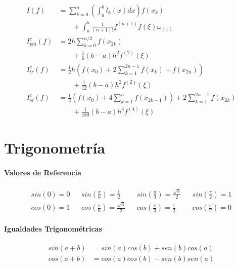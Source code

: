 \documentclass[a4paper]{article}
\begin{document}
\begin{multicols}{2}
        \begin{align*}
          I(f) &= \sum_{k=0}^n \left(\int_a^bl_k(x) dx \right) f(x_k) \\
                        & \quad \quad + \int_a^b \frac{1}{(n+1)!}f^{(n+1)}f(\xi)\omega_(x)\\
          I_{pm} ^ c(f) &= 2h\sum_{k=0}^{n/2}f\left(x_{2k}\right) \\
                        & \quad \quad + \frac{1}{6}(b-a)h^2f^{(2)}(\xi) \\
          I_{tr} ^ c(f) &= \frac{1}{2}h(f(x_0) + 2 \sum_{k=1}^{2n-1} f(x_k) + f(x_{2n})) \\
                        & \quad \quad +  \frac{1}{12} (b-a)h^2f^{(2)}(\xi) \\
          I_{si} ^ c(f) &=  \frac{1}{3} (f(x_0) + 4 \sum_{k=1}^nf(x_{2k-1})) + 2 \sum_{k=1}^{2n-1} f(x_{2k})\\
                        & \quad \quad +  \frac{1}{180} (b-a)h^4f^{(4)}(\xi)
        \end{align*}

    \appendix
    \section{Trigonometría}

      \paragraph{Valores de Referencia}

      \begin{align*}
        sin\left(0\right) = 0 &&
        sin\left(\frac{\pi}{6}\right) = \frac{1}{2} &&
        sin\left(\frac{\pi}{3}\right) = \frac{\sqrt{3}}{2} &&
        sin\left(\frac{\pi}{2}\right) = 1 \\
        cos\left(0\right) = 1 &&
        cos\left(\frac{\pi}{6}\right) = \frac{\sqrt{3}}{2} &&
        cos\left(\frac{\pi}{3}\right) = \frac{1}{2} &&
        cos\left(\frac{\pi}{2}\right) = 0
      \end{align*}

      \paragraph{Igualdades Trigonométricas}

      \begin{align*}
        sin(a + b) &= sin(a)cos(b) + sen(b)cos(a) \\
        cos(a + b) &= cos(a)cos(b) - sen(b)sen(a)
      \end{align*}


  \end{multicols}
\end{document}
